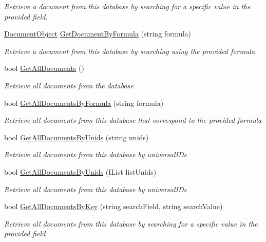 \begin{DoxyCompactItemize}
\begin{DoxyCompactList}\small\item\em Retrieve a document from this database by searching for a specific value in the provided field. \end{DoxyCompactList}\item 
\hyperlink{class_document_object}{Document\+Object} \hyperlink{class_database_object_ae5477aedfcd0d54b21017faa1389bc71}{Get\+Document\+By\+Formula} (string formula)
\begin{DoxyCompactList}\small\item\em Retrieve a document from this database by searching using the provided formula. \end{DoxyCompactList}\item 
bool \hyperlink{class_database_object_ad3010e55b2e75d0863e168fed1e279c5}{Get\+All\+Documents} ()
\begin{DoxyCompactList}\small\item\em Retrieve all documents from the database \end{DoxyCompactList}\item 
bool \hyperlink{class_database_object_a6bfb480373a7e2bdbeaa67e4e3303a3a}{Get\+All\+Documents\+By\+Formula} (string formula)
\begin{DoxyCompactList}\small\item\em Retrieve all documents from this database that correspond to the provided formula \end{DoxyCompactList}\item 
bool \hyperlink{class_database_object_a4d8a7d73614f53a04fe8eb79bef2f614}{Get\+All\+Documents\+By\+Unids} (string unids)
\begin{DoxyCompactList}\small\item\em Retrieve all documents from this database by universal\+I\+Ds \end{DoxyCompactList}\item 
bool \hyperlink{class_database_object_a92e80ea30e83cddf47f29d0f502b81c5}{Get\+All\+Documents\+By\+Unids} (I\+List list\+Unids)
\begin{DoxyCompactList}\small\item\em Retrieve all documents from this database by universal\+I\+Ds \end{DoxyCompactList}\item 
bool \hyperlink{class_database_object_ad4834e7677cd0418969a657eed99653c}{Get\+All\+Documents\+By\+Key} (string search\+Field, string search\+Value)
\begin{DoxyCompactList}\small\item\em Retrieve all documents from this database by searching for a specific value in the provided field \end{DoxyCompactList}\item 

\end{DoxyCompactItemize}
